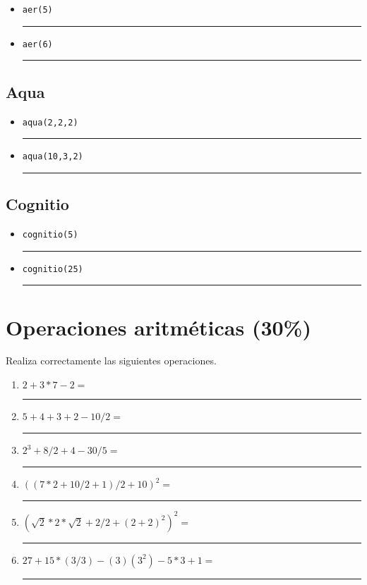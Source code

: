 \documentclass[11pt, onside]{article}
\newcommand{\matlab}[1]{\lstinline[style=Matlab-bw]!#1!}
\newcommand{\shortresponserule}{{\large\rule{5 cm}{0.3mm}}}
\begin{document}

\begin{itemize}
    \item \matlab{aer(5)} \hfill \shortresponserule
    \item \matlab{aer(6)} \hfill \shortresponserule
\end{itemize}

\subsection*{Aqua}


\begin{itemize}
    \item \matlab{aqua(2,2,2)} \hfill \shortresponserule
    \item \matlab{aqua(10,3,2)} \hfill \shortresponserule
\end{itemize}

\subsection*{Cognitio}


\begin{itemize}
    \item \matlab{cognitio(5)} \hfill \shortresponserule
    \item \matlab{cognitio(25)} \hfill \shortresponserule
\end{itemize}

\section{Operaciones aritméticas (30\%)}

Realiza correctamente las siguientes operaciones.

\begin{enumerate}[label=\alph*)]
    \item $2 + 3 * 7 - 2 =$ \hfill \shortresponserule
    \item $5 + 4 + 3 + 2 - 10 / 2 =$ \hfill \shortresponserule
    \item $2^3 + 8 / 2 + 4 - 30 / 5 =$ \hfill \shortresponserule
    \item $((7 * 2 + 10 / 2 + 1) / 2 + 10)^2 =$ \hfill \shortresponserule
    \item $(\sqrt{2} * 2 * \sqrt{2} + 2 / 2 + (2 + 2)^2)^2 =$ \hfill \shortresponserule
    \item $27 + 15 * (3 / 3) - (3)(3^2) - 5 * 3 + 1 =$ \hfill \shortresponserule
\end{enumerate}
\end{document}
